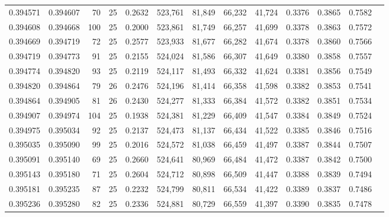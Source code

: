 \begin{tabular}{rrrrrrrrrrrrr}
0.394571 & 0.394607 &    70 &  25 &                                     0.2632 & 523,761 &  81,849 &  66,232 &  41,724 & 0.3376 & 0.3865 & 0.7582 \\
0.394608 & 0.394668 &   100 &  25 &                                     0.2000 & 523,861 &  81,749 &  66,257 &  41,699 & 0.3378 & 0.3863 & 0.7572 \\
0.394669 & 0.394719 &    72 &  25 &                                     0.2577 & 523,933 &  81,677 &  66,282 &  41,674 & 0.3378 & 0.3860 & 0.7566 \\
0.394719 & 0.394773 &    91 &  25 &                                     0.2155 & 524,024 &  81,586 &  66,307 &  41,649 & 0.3380 & 0.3858 & 0.7557 \\
0.394774 & 0.394820 &    93 &  25 &                                     0.2119 & 524,117 &  81,493 &  66,332 &  41,624 & 0.3381 & 0.3856 & 0.7549 \\
0.394820 & 0.394864 &    79 &  26 &                                     0.2476 & 524,196 &  81,414 &  66,358 &  41,598 & 0.3382 & 0.3853 & 0.7541 \\
0.394864 & 0.394905 &    81 &  26 &                                     0.2430 & 524,277 &  81,333 &  66,384 &  41,572 & 0.3382 & 0.3851 & 0.7534 \\
0.394907 & 0.394974 &   104 &  25 &                                     0.1938 & 524,381 &  81,229 &  66,409 &  41,547 & 0.3384 & 0.3849 & 0.7524 \\
0.394975 & 0.395034 &    92 &  25 &                                     0.2137 & 524,473 &  81,137 &  66,434 &  41,522 & 0.3385 & 0.3846 & 0.7516 \\
0.395035 & 0.395090 &    99 &  25 &                                     0.2016 & 524,572 &  81,038 &  66,459 &  41,497 & 0.3387 & 0.3844 & 0.7507 \\
0.395091 & 0.395140 &    69 &  25 &                                     0.2660 & 524,641 &  80,969 &  66,484 &  41,472 & 0.3387 & 0.3842 & 0.7500 \\
0.395143 & 0.395180 &    71 &  25 &                                     0.2604 & 524,712 &  80,898 &  66,509 &  41,447 & 0.3388 & 0.3839 & 0.7494 \\
0.395181 & 0.395235 &    87 &  25 &                                     0.2232 & 524,799 &  80,811 &  66,534 &  41,422 & 0.3389 & 0.3837 & 0.7486 \\
0.395236 & 0.395280 &    82 &  25 &                                     0.2336 & 524,881 &  80,729 &  66,559 &  41,397 & 0.3390 & 0.3835 & 0.7478 \\

\end{tabular}
